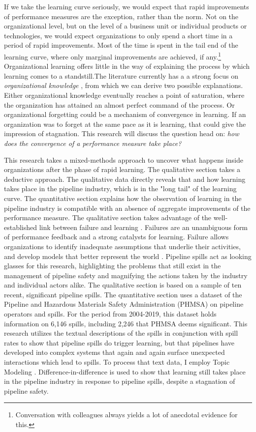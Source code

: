 If we take the learning curve seriously, we would expect that rapid improvements of performance measures are the exception, rather than the norm. Not on the organizational level, but on the level of a business unit or individual products or technologies, we would expect organizations to only spend a short time in a period of rapid improvements. Most of the time is spent in the tail end of the learning curve, where only marginal improvements are achieved, if any.\footnote{Conversation with colleagues always yields a lot of anecdotal evidence for this.} Organizational learning offers little in the way of explaining the process by which learning comes to a standstill.The literature currently has a a strong focus on \textit{organizational knowledge} \citep{Bingham2011}, from which we can derive two possible explanations. Either organizational knowledge eventually reaches a point of saturation, where the organization has attained an almost perfect command of the process. Or organizational forgetting could be a mechanism of convergence in learning. If an organization was to forget at the same pace as it is learning, that could give the impression of stagnation. This research will discuss the question head on: \textit{how does the convergence of a performance measure take place?}

This research takes a mixed-methods approach to uncover what happens inside organizations after the phase of rapid learning. The qualitative section takes a deductive approach. The qualitative data directly reveals that and how learning takes place in the pipeline industry, which is in the "long tail" of the learning curve. The quantitative section explains how the observation of learning in the pipeline industry is compatible with an absence of aggregate improvements of the performance measure. The qualitative section takes advantage of the well-established link between failure and learning \citep{Kim2007, Baum2007}. Failures are an unambiguous form of performance feedback and a strong catalysts for learning. Failure allows organizations to identify inadequate assumptions that underlie their activities, and develop models that better represent the world \citep{Madsen2010}. Pipeline spills act as looking glasses for this research, highlighting the problems that still exist in the management of pipeline safety and magnifying the actions taken by the industry and individual actors alike. The qualitative section is based on a sample of ten recent, significant pipeline spills. The quantitative section uses a dataset of the Pipeline and Hazardous Materials Safety Administration (PHMSA) on pipeline operators and spills. For the period from 2004-2019, this dataset holds information on 6,146 spills, including 2,246 that PHMSA deems significant. This research utilizes the textual descriptions of the spills in conjunction with spill rates to show that pipeline spills do trigger learning, but that pipelines have developed into complex systems that again and again surface unexpected interactions which lead to spills. To process that text data, I employ Topic Modeling \citep{Hannigan2019}. Difference-in-difference is used to show that learning still takes place in the pipeline industry in response to pipeline spills, despite a stagnation of pipeline safety.

